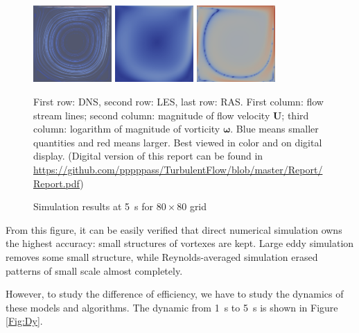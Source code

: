 \documentclass[english, nochinese]{pkupaper}
\begin{document}
\begin{figure}[htbp]
{{
\includegraphics[width=3cm]{Results/Figure01h.pdf}
\includegraphics[width=3cm]{Results/Figure01g.pdf}
\includegraphics[width=3cm]{Results/Figure02o.pdf}
}
\caption{Simulation results at \SI{5}{s} for $ 80 \times 80 $ grid}
\label{Fig:Over}
}
{
\footnotesize
First row: DNS, second row: LES, last row: RAS. First column: flow stream lines; second column: magnitude of flow velocity $\mathbf{U}$; third column: logarithm of magnitude of vorticity $\bm{\omega}$. Blue means smaller quantities and red means larger. Best viewed in color and on digital display. (Digital version of this report can be found in \url{https://github.com/pppppass/TurbulentFlow/blob/master/Report/Report.pdf})
}
\end{figure}

From this figure, it can be easily verified that direct numerical simulation owns the highest accuracy: small structures of vortexes are kept. Large eddy simulation removes some small structure, while Reynolds-averaged simulation erased patterns of small scale almost completely.

However, to study the difference of efficiency, we have to study the dynamics of these models and algorithms. The dynamic from \SI{1}{\second} to \SI{5}{\second} is shown in Figure \ref{Fig:Dy}.
\end{document}
